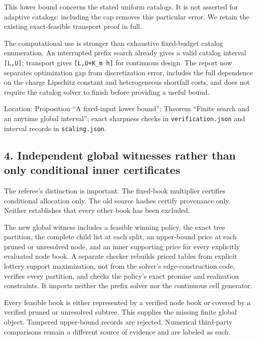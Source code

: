 \documentclass[11pt,letterpaper]{article}
\begin{document}
This lower bound concerns the stated uniform catalogs. It is not asserted for adaptive catalogs: including the cap removes this particular error. We retain the existing exact-feasible transport proof in full.



The computational use is stronger than exhaustive fixed-budget catalog enumeration. An interrupted prefix search already gives a valid catalog interval \nolinkurl{[L,U]}; transport gives \texttt{[L,U+K\_m h]} for continuous design. The report now separates optimization gap from discretization error, includes the full dependence on the charge Lipschitz constant and heterogeneous shortfall costs, and does not require the catalog solver to finish before providing a useful bound.



Location: Proposition “A fixed-input lower bound”; Theorem “Finite search and an anytime global interval”; exact sharpness checks in \nolinkurl{verification.json} and interval records in \nolinkurl{scaling.json}.



\subsection*{4. Independent global witnesses rather than only conditional inner certificates}


The referee's distinction is important. The fixed-book multiplier certifies conditional allocation only. The old source hashes certify provenance only. Neither establishes that every other book has been excluded.



The new global witness includes a feasible winning policy, the exact tree partition, the complete child list at each split, an upper-bound price at each pruned or unresolved node, and an inner supporting price for every explicitly evaluated node book. A separate checker rebuilds priced tables from explicit lottery support maximization, not from the solver's edge-construction code, verifies every partition, and checks the policy's exact promise and realization constraints. It imports neither the prefix solver nor the continuous cell generator.



Every feasible book is either represented by a verified node book or covered by a verified pruned or unresolved subtree. This supplies the missing finite global object. Tampered upper-bound records are rejected. Numerical third-party comparisons remain a different source of evidence and are labeled as such.
\end{document}
